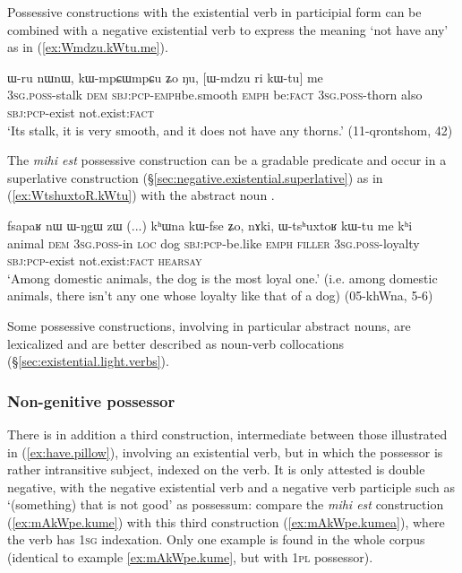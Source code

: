 Possessive constructions with the existential verb  in participial form can be combined with a negative existential verb  to express the meaning `not have any' as in (\ref{ex:Wmdzu.kWtu.me}).
 
\begin{exe}
\ex \label{ex:Wmdzu.kWtu.me}
\gll  ɯ-ru nɯnɯ, kɯ-mpɕɯ\redp{}mpɕu ʑo ŋu, [ɯ-mdzu ri kɯ-tu] me \\
\textsc{3sg}.\textsc{poss}-stalk \textsc{dem} \textsc{sbj}:\textsc{pcp}-\textsc{emph}\redp{}be.smooth \textsc{emph} be:\textsc{fact} \textsc{3sg}.\textsc{poss}-thorn also \textsc{sbj}:\textsc{pcp}-exist not.exist:\textsc{fact} \\
\glt `Its stalk, it is very smooth, and it does not have any thorns.' (11-qrontshom, 42)
\end{exe} 


The \textit{mihi est} possessive construction can be a gradable predicate and occur in a superlative construction (§\ref{sec:negative.existential.superlative}) as in (\ref{ex:WtshuxtoR.kWtu}) with the abstract noun .  

\begin{exe}
\ex \label{ex:WtshuxtoR.kWtu}
\gll  fsapaʁ nɯ ɯ-ŋgɯ zɯ (...) kʰɯna kɯ-fse ʑo, nɤki, ɯ-tsʰuxtoʁ kɯ-tu me kʰi \\
animal \textsc{dem} \textsc{3sg}.\textsc{poss}-in \textsc{loc} {  } dog \textsc{sbj}:\textsc{pcp}-be.like \textsc{emph} \textsc{filler} \textsc{3sg}.\textsc{poss}-loyalty \textsc{sbj}:\textsc{pcp}-exist not.exist:\textsc{fact} \textsc{hearsay} \\
\glt  `Among domestic animals, the dog is the most loyal one.' (i.e. among domestic animals, there isn't any one whose loyalty like that of a dog) (05-khWna, 5-6)
\end{exe}


Some possessive constructions, involving in particular abstract nouns,  are lexicalized and are better described as noun-verb collocations (§\ref{sec:existential.light.verbs}).

 \subsubsection{Non-genitive possessor} \label{sec:possessive.existential2}
There is in addition a third construction, intermediate between those illustrated in (\ref{ex:have.pillow}), involving an existential verb, but in which the possessor is rather intransitive subject, indexed on the verb. It is only attested is double negative, with the negative existential verb  and a negative verb participle such as  `(something) that is not good' as possessum: compare the \textit{mihi est} construction (\ref{ex:mAkWpe.kume}) with this third construction (\ref{ex:mAkWpe.kumea}), where the verb has \textsc{1sg} indexation. Only one example is found in the whole corpus (identical to example \ref{ex:mAkWpe.kume}, but with \textsc{1pl} possessor).
 
